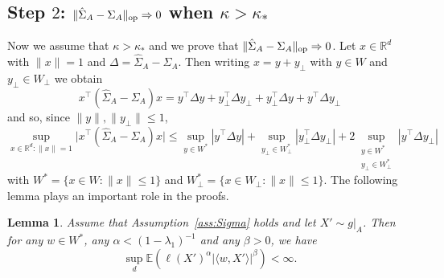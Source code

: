 \documentclass[]{article}
\newcommand{\E}{\mathbb{E}}
\newcommand{\R}{\mathbb{R}}
\newcommand{\op}{{\rm op}}
\theoremstyle{plain}
\newtheorem{lemma}{Lemma}[section]
\theoremstyle{definition}
\begin{document}
\subsection{Step $2$: $\lVert \hat \Sigma_A - \Sigma_A \rVert_\op \Rightarrow 0$ when $\kappa > \kappa_*$} \label{sub:step-2}

Now we assume that $\kappa > \kappa_*$ and we prove that $\lVert \hat \Sigma_A - \Sigma_A \rVert_\op \Rightarrow 0$. Let $x \in \R^d$ with $\lVert x \rVert = 1$ and $\Delta = \hat \Sigma_A - \Sigma_A$. Then writing $x = y + y_\perp$ with $y \in W$ and $y_\perp \in W_\perp$ we obtain
\[ x^\top (\hat \Sigma_A - \Sigma_A) x = y^\top \Delta y + y^\top_\perp \Delta y_\perp + y^\top_\perp \Delta y + y^\top \Delta y_\perp \]
and so, since $\lVert y \rVert, \lVert y_\perp \rVert \leq 1$,
\[ \sup_{x \in \R^d: \lVert x \rVert = 1} \lvert x^\top (\hat \Sigma_A - \Sigma_A) x \rvert \leq \sup_{y \in W^*} \left \lvert y^\top \Delta y \right \rvert + \sup_{y_\perp \in W^*_\perp} \left \lvert y_\perp^\top \Delta y_\perp \right \rvert + 2\sup_{\substack{y \in W^*\\y_\perp \in W^*_\perp}} \left \lvert y^\top \Delta y_\perp \right \rvert \]
with $W^* = \{x \in W: \lVert x \rVert \leq 1\}$ and $W^*_\perp = \{x \in W_\perp: \lVert x \rVert \leq 1\}$. The following lemma plays an important role in the proofs.

\begin{lemma}\label{lemma:moments}
	Assume that Assumption~\ref{ass:Sigma} holds and let $X' \sim g|_A$. Then for any $w \in W^*$, any $\alpha < (1-\lambda_1)^{-1}$ and any $\beta > 0$, we have
	\[ \sup_d \E \left( \ell(X')^\alpha \lvert \langle w, X' \rangle \rvert^\beta \right) < \infty. \]
\end{lemma}
\end{document}
